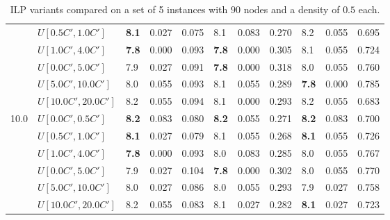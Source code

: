 \begin{table}[h]
{\begin{tabular}{|l|l||l|l|l||l|l|l||l|l|l|}
       & $U[0.5C',1.0C']$ & \textbf{8.1} & 0.027 & 0.075 & 8.1 & 0.083 & 0.270 & 8.2 & 0.055 & 0.695 \\
       & $U[1.0C',4.0C']$ & \textbf{7.8} & 0.000 & 0.093 & \textbf{7.8} & 0.000 & 0.305 & 8.1 & 0.055 & 0.724 \\
       & $U[0.0C',5.0C']$ & 7.9 & 0.027 & 0.091 & \textbf{7.8} & 0.000 & 0.318 & 8.0 & 0.055 & 0.760 \\
       & $U[5.0C',10.0C']$ & 8.0 & 0.055 & 0.093 & 8.1 & 0.055 & 0.289 & \textbf{7.8} & 0.000 & 0.785 \\
       & $U[10.0C',20.0C']$ & 8.2 & 0.055 & 0.094 & 8.1 & 0.000 & 0.293 & 8.2 & 0.055 & 0.683 \\
      \hline\hline
      \multirow{6}{*}{10.0} & $U[0.0C',0.5C']$ & \textbf{8.2} & 0.083 & 0.080 & \textbf{8.2} & 0.055 & 0.271 & \textbf{8.2} & 0.083 & 0.700 \\
       & $U[0.5C',1.0C']$ & \textbf{8.1} & 0.027 & 0.079 & 8.1 & 0.055 & 0.268 & \textbf{8.1} & 0.055 & 0.726 \\
       & $U[1.0C',4.0C']$ & \textbf{7.8} & 0.000 & 0.093 & 8.0 & 0.083 & 0.285 & 8.0 & 0.055 & 0.767 \\
       & $U[0.0C',5.0C']$ & 7.9 & 0.027 & 0.104 & \textbf{7.8} & 0.000 & 0.302 & 8.0 & 0.055 & 0.770 \\
       & $U[5.0C',10.0C']$ & 8.0 & 0.027 & 0.086 & 8.0 & 0.055 & 0.293 & 7.9 & 0.027 & 0.758 \\
       & $U[10.0C',20.0C']$ & 8.2 & 0.055 & 0.083 & 8.1 & 0.027 & 0.282 & \textbf{8.1} & 0.027 & 0.723 \\
      \hline
      \end{tabular}
      }
      \caption{ILP variants compared on a set of 5 instances with $90$ nodes and a density of $0.5$ each.}
      \label{tab:pcpn90RecoloredTT}\end{table}
 
